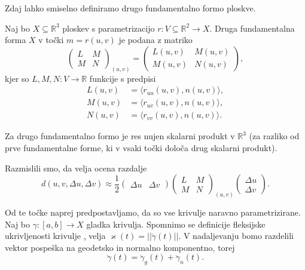 Zdaj lahko smiselno definiramo drugo fundamentalno formo ploskve.

\begin{definicija}
\label{def_druga_fundamentalna_forma_ploskve}
 Naj bo $X \subseteq \mathbb{R}^3$ ploskev s parametrizacijo $r: V \subseteq \mathbb{R}^2 \to  X$. Druga fundamentalna forma $X$ v točki $m = r(u,v)$ je podana z matriko 
 \begin{equation*} \begin{pmatrix}
 L & M \\
 M & N
 \end{pmatrix}_{(u,v)} = \begin{pmatrix}
 L(u,v) & M(u,v) \\
 M(u,v) & N(u,v)
 \end{pmatrix}, \end{equation*}
 kjer so $L, M, N: V \to  \mathbb{R}$ funkcije s predpisi 
 \begin{align*}
    L(u,v)  &= \langle r_{uu}(u,v), n(u,v) \rangle,  \\
    M(u,v)  &= \langle r_{uv}(u,v), n(u,v) \rangle,  \\
    N(u,v)  &= \langle r_{vv}(u,v), n(u,v) \rangle. 
 \end{align*}

\end{definicija}

\begin{opomba}
    Za drugo fundamentalno formo je res nujen skalarni produkt v $\mathbb{R}^3$ (za razliko od prve fundamentalne forme, ki v vsaki točki določa drug skalarni produkt). 
\end{opomba}

Razmislili smo, da velja ocena razdalje
\begin{equation*} d(u, v, \Delta u, \Delta v) \approx \frac{1}{2} \begin{pmatrix}
  \Delta u  &  \Delta v 
\end{pmatrix} \begin{pmatrix}
  L & M \\
  M & N
\end{pmatrix}_{(u,v)}  
\begin{pmatrix}
  \Delta u \\
  \Delta v 
\end{pmatrix}.\end{equation*}

Od te točke naprej predpostavljamo, da so vse krivulje naravno parametrizirane. Naj bo $\gamma: [a,b] \to X$ gladka krivulja. 
Spomnimo se definicije fleksijske ukrivljenosti krivulje \href{def_fleksijska_ukrivljenost}, velja $\varkappa(t) = \lvert\lvert \ddot{\gamma}(t) \rvert\rvert$.
V nadaljevanju bomo razdelili vektor pospeška na geodetsko in normalno komponentno, torej 
\begin{equation*} \ddot{\gamma}(t) = \ddot{\gamma}_g(t) + \ddot{\gamma}_n(t).\end{equation*}


